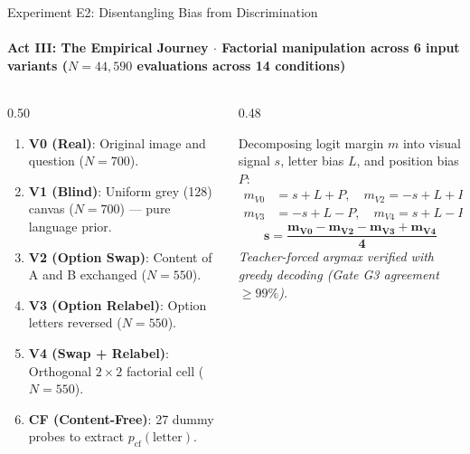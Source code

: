 \documentclass[aspectratio=169, 10pt]{beamer}
\begin{document}
\begin{frame}{Experiment E2: Disentangling Bias from Discrimination}
  \framesubtitle{Act III: The Empirical Journey $\cdot$ Factorial manipulation across 6 input variants ($N=44,590$ evaluations across 14 conditions)}
  
  \begin{columns}[T]
    \begin{column}{0.50\textwidth}
      \begin{tcolorbox}[metriccard, title=\textbf{Six Controlled Input Variants}]
        \scriptsize
        \begin{enumerate}\setlength{\itemsep}{2pt}
          \item \textbf{V0 (Real)}: Original image and question ($N=700$).
          \item \textbf{V1 (Blind)}: Uniform grey (128) canvas ($N=700$) --- pure language prior.
          \item \textbf{V2 (Option Swap)}: Content of A and B exchanged ($N=550$).
          \item \textbf{V3 (Option Relabel)}: Option letters reversed ($N=550$).
          \item \textbf{V4 (Swap + Relabel)}: Orthogonal $2\times 2$ factorial cell ($N=550$).
          \item \textbf{CF (Content-Free)}: 27 dummy probes to extract $p_{\text{cf}}(\text{letter})$.
        \end{enumerate}
      \end{tcolorbox}
    \end{column}
    
    \begin{column}{0.48\textwidth}
      \begin{tcolorbox}[accentcard, title=\textbf{Debiased Discrimination Formula}]
        \scriptsize
        Decomposing logit margin $m$ into visual signal $s$, letter bias $L$, and position bias $P$:
        \begin{align*}
          m_{V0} &= s + L + P, \quad m_{V2} = -s + L + P \\
          m_{V3} &= -s + L - P, \quad m_{V4} = s + L - P
        \end{align*}
        \begin{equation*}
          \mathbf{s = \frac{m_{V0} - m_{V2} - m_{V3} + m_{V4}}{4}}
        \end{equation*}
        \textit{Teacher-forced argmax verified with greedy decoding (Gate G3 agreement $\ge 99\%$).}
      \end{tcolorbox}
    \end{column}
  \end{columns}

\end{frame}
\end{document}
